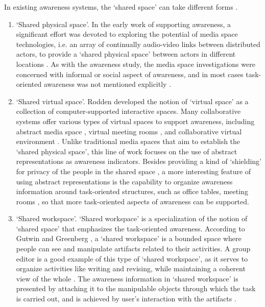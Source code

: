 In existing awareness systems, the `shared space' can take different forms \cite{antunes2010a}. 
\begin{enumerate}
	\item `Shared physical space'. In the early work of supporting awareness, a significant effort was devoted to exploring the potential of media space technologies, i.e. an array of continually audio-video links between distributed actors, to provide a `shared physical space' between actors in different locations \cite{Dourish1992}. As with the awareness study, the media space investigations were concerned with informal or social aspect of awareness, and in most cases task-oriented awareness was not mentioned explicitly \cite{schmidt2002a}.
	\item `Shared virtual space'. Rodden \cite{Rodden1996} developed the notion of `virtual space' as a collection of computer-supported interactive spaces. Many collaborative systems offer various types of virtual spaces to support awareness, including abstract media space \cite{Pedersen1997}, virtual meeting rooms \cite{Berlage1999}, and collaborative virtual environment \cite{Benford2001}. Unlike traditional media spaces that aim to establish the `shared physical space', this line of work focuses on the use of abstract representations as awareness indicators. Besides providing a kind of `shielding' for privacy of the people in the shared space \cite{Pedersen1997}, a more interesting feature of using abstract representations is the capability to organize awareness information around task-oriented structures, such as office tables, meeting rooms \cite{Berlage1999}, so that more task-oriented aspects of awareness can be supported.
	\item `Shared workspace'. `Shared workspace' is a specialization of the notion of `shared space' that emphasizes the task-oriented awareness. According to Gutwin and Greenberg \cite{Gutwin2002}, a `shared workspace' is a bounded space where people can see and manipulate artifacts related to their activities. A group editor is a good example of this type of `shared workspace', as it serves to organize activities like writing and revising, while maintaining a coherent view of the whole \cite{dourish1992awareness}. The awareness information in `shared workspace' is presented by attaching it to the manipulable objects through which the task is carried out, and is achieved by user's interaction with the artifacts \cite{Gutwin2002}.
\end{enumerate}

